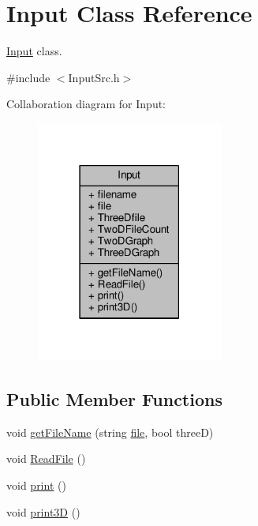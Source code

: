\hypertarget{classInput}{}\section{Input Class Reference}
\label{classInput}


\hyperlink{classInput}{Input} class.  




{\ttfamily \#include $<$Input\+Src.\+h$>$}



Collaboration diagram for Input\+:\nopagebreak
\begin{figure}[H]
\begin{center}
\leavevmode
\includegraphics[width=174pt]{classInput__coll__graph}
\end{center}
\end{figure}
\subsection*{Public Member Functions}
\begin{DoxyCompactItemize}
\item 
void \hyperlink{classInput_a45065353b80f9980111402e827aae0fe}{get\+File\+Name} (string \hyperlink{classInput_ad073fa115ead2e8b7492214215ebd22d}{file}, bool threeD)
\item 
void \hyperlink{classInput_a9d9395f68b01faa00f962791878723a2}{Read\+File} ()
\item 
void \hyperlink{classInput_a862e529a6ed3fcfd0719274a04174b7d}{print} ()
\item 
void \hyperlink{classInput_aced126e54ffa271b2a40f7e7a5e90376}{print3D} ()
\end{DoxyCompactItemize}
